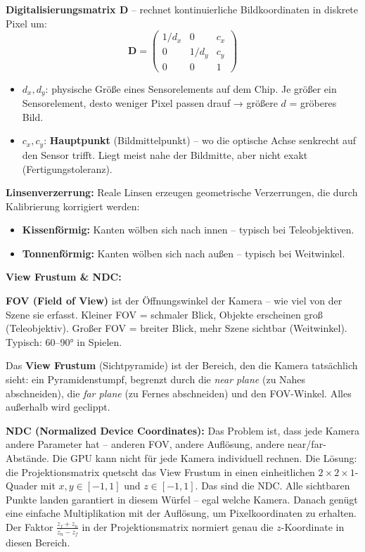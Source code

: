 \documentclass[12pt, a4paper]{article}
\begin{document}
\textbf{Digitalisierungsmatrix D} -- rechnet kontinuierliche Bildkoordinaten in diskrete Pixel um:
\[
  \mathbf{D} = \begin{pmatrix}1/d_x&0&c_x\\0&1/d_y&c_y\\0&0&1\end{pmatrix}
\]
\begin{itemize}
  \item $d_x, d_y$: physische Größe eines Sensorelements auf dem Chip. Je größer ein Sensorelement, desto weniger Pixel passen drauf → größere $d$ = gröberes Bild.
  \item $c_x, c_y$: \textbf{Hauptpunkt} (Bildmittelpunkt) -- wo die optische Achse senkrecht auf den Sensor trifft. Liegt meist nahe der Bildmitte, aber nicht exakt (Fertigungstoleranz).
\end{itemize}

\textbf{Linsenverzerrung:} Reale Linsen erzeugen geometrische Verzerrungen, die durch Kalibrierung korrigiert werden:
\begin{itemize}
  \item \textbf{Kissenförmig:} Kanten wölben sich nach innen -- typisch bei Teleobjektiven.
  \item \textbf{Tonnenförmig:} Kanten wölben sich nach außen -- typisch bei Weitwinkel.
\end{itemize}

\textbf{View Frustum \& NDC:}

\textbf{FOV (Field of View)} ist der Öffnungswinkel der Kamera -- wie viel von der Szene sie erfasst. Kleiner FOV = schmaler Blick, Objekte erscheinen groß (Teleobjektiv). Großer FOV = breiter Blick, mehr Szene sichtbar (Weitwinkel). Typisch: 60–90° in Spielen.

Das \textbf{View Frustum} (Sichtpyramide) ist der Bereich, den die Kamera tatsächlich sieht: ein Pyramidenstumpf, begrenzt durch die \textit{near plane} (zu Nahes abschneiden), die \textit{far plane} (zu Fernes abschneiden) und den FOV-Winkel. Alles außerhalb wird geclippt.

\textbf{NDC (Normalized Device Coordinates):} Das Problem ist, dass jede Kamera andere Parameter hat -- anderen FOV, andere Auflösung, andere near/far-Abstände. Die GPU kann nicht für jede Kamera individuell rechnen. Die Lösung: die Projektionsmatrix quetscht das View Frustum in einen einheitlichen $2\times2\times1$-Quader mit $x,y \in [-1,1]$ und $z \in [-1,1]$. Das sind die NDC. Alle sichtbaren Punkte landen garantiert in diesem Würfel -- egal welche Kamera. Danach genügt eine einfache Multiplikation mit der Auflösung, um Pixelkoordinaten zu erhalten. Der Faktor $\frac{z_f+z_n}{z_n-z_f}$ in der Projektionsmatrix normiert genau die $z$-Koordinate in diesen Bereich.
\end{document}
